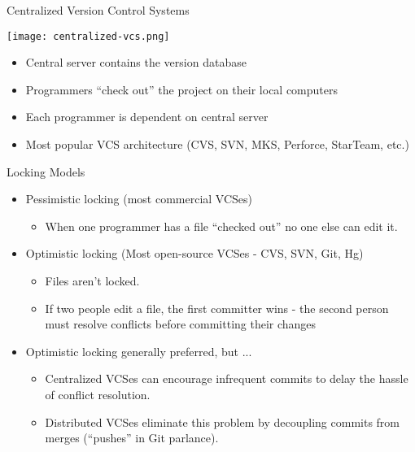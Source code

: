 \documentclass{beamer}
\begin{document}
\begin{frame}[fragile]{Centralized Version Control Systems}

\begin{center}
\texttt{[image: centralized-vcs.png]}
\end{center}

\begin{itemize}
\item Central server contains the version database
\item Programmers ``check out'' the project on their local computers
\item Each programmer is dependent on central server
\item Most popular VCS architecture (CVS, SVN, MKS, Perforce, StarTeam, etc.)
\end{itemize}


\end{frame}

\begin{frame}[fragile]{Locking Models}

\begin{itemize}
\item Pessimistic locking (most commercial VCSes)
\begin{itemize}
\item When one programmer has a file ``checked out'' no one else can edit it.
\end{itemize}
\item Optimistic locking (Most open-source VCSes - CVS, SVN, Git, Hg)
\begin{itemize}
\item Files aren't locked.
\item If two people edit a file, the first committer wins - the second person must resolve conflicts before committing their changes
\end{itemize}

\item Optimistic locking generally preferred, but ...
\begin{itemize}
\item Centralized VCSes can encourage infrequent commits to delay the hassle of conflict resolution.
\item Distributed VCSes eliminate this problem by decoupling commits from merges (``pushes'' in Git parlance).
\end{itemize}
\end{itemize}

\end{frame}
\end{document}
